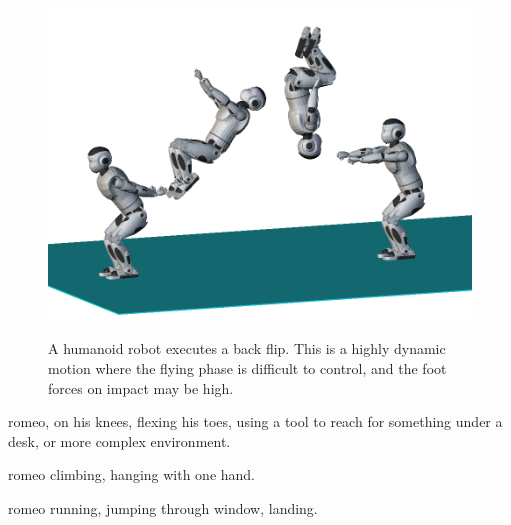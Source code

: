 \begin{figure}
  \centering
      {\includegraphics[width = 0.8\linewidth]
        {src/chap4-conclusion/romeo-back-flip.png}}
      \caption{A humanoid robot executes a back flip. This is a highly
        dynamic motion where the flying phase is difficult to control,
        and the foot forces on impact may be high.}
      \label{fig:chap4-romeo-back-flip}
\end{figure}

romeo, on his knees, flexing his toes, using a tool to reach for
something under a desk, or more complex environment.

romeo climbing, hanging with one hand.

romeo running, jumping through window, landing.
